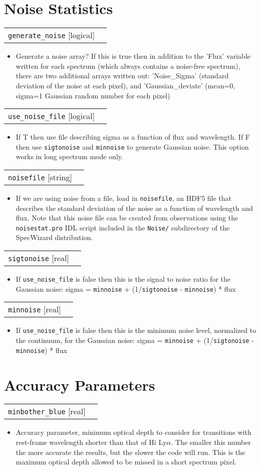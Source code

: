 \documentclass{report}
\makeatletter
\newcommand{\paramdefinition}[3]{
\begin{tabular*}{\textwidth}{l@{\extracolsep{\fill}}r}
		{\tt #1} [{\sc #2}]& #3 \\
\end{tabular*}}
\newcommand{\paramdescription}[1]{
\begin{itemize}
\item #1
\end{itemize}\vspace{0.2cm}}
\makeatother
\begin{document}
\section{Noise Statistics}

\paramdefinition{generate\_noise}{logical}{}
\paramdescription{Generate a noise array?  If this is true then in addition to the 'Flux' variable written for each spectrum (which always contains a noise-free spectrum), there are two additional arrays written out: 'Noise\_Sigma' (standard deviation of the noise at each pixel), and 'Gaussian\_deviate' (mean=0, sigma=1 Gaussian random number for each pixel)}

\paramdefinition{use\_noise\_file}{logical}{}
\paramdescription{If T then use file describing sigma as a function of flux and wavelength.  If F then use {\tt sigtonoise} and {\tt minnoise} to generate Gaussian noise.  This option works in long spectrum mode only.}

\paramdefinition{noisefile}{string}{}
\paramdescription{If we are using noise from a file, load in {\tt noisefile}, an HDF5 file that describes the standard deviation of the noise as a function of wavelength and flux.  Note that this noise file can be created from observations using the {\tt noisestat.pro} IDL script included in the {\tt Noise/} subdirectory of the SpecWizard distribution.}

\paramdefinition{sigtonoise}{real}{}
\paramdescription{If {\tt use\_noise\_file} is false then this is the signal to noise ratio for the Gaussian noise: sigma = {\tt minnoise} + (1/{\tt sigtonoise} - {\tt minnoise}) * flux}

\paramdefinition{minnoise}{real}{}
\paramdescription{If {\tt use\_noise\_file} is false then this is the minimum noise level, normalized to the continuum, for the Gaussian noise: sigma = {\tt minnoise} + (1/{\tt sigtonoise} - {\tt minnoise}) * flux}

\section{Accuracy Parameters}

\paramdefinition{minbother\_blue}{real}{}
\paramdescription{Accuracy parameter, minimum optical depth to consider for transitions with rest-frame wavelength shorter than that of H{\sc i} Ly$\alpha$.  The smaller this number the more accurate the results, but the slower the code will run. This is the maximum optical depth allowed to be missed in a short spectrum pixel.}
\end{document}
